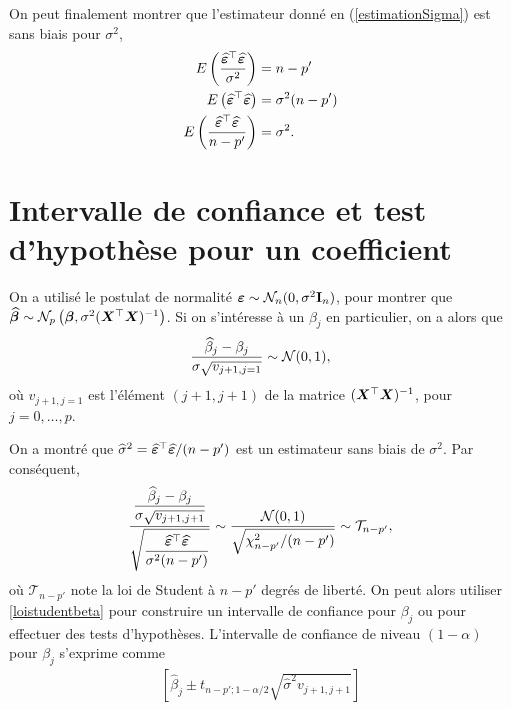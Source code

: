On peut finalement montrer que l'estimateur donné en (\ref{estimationSigma}) est sans biais pour $\sigma^2$,
\begin{align*}
E \left( \frac{\widehat{\bm\varepsilon}^\top\widehat{\bm\varepsilon}}{\sigma^2} \right) &= n-p' \\
E \left( \widehat{\bm\varepsilon}^\top\widehat{\bm\varepsilon} \right) &= \sigma^2 (n-p') \\
E \left( \frac{\widehat{\bm\varepsilon}^\top\widehat{\bm\varepsilon}}{n-p'} \right) &= \sigma^2.
\end{align*}


\section{Intervalle de confiance et test d'hypothèse pour un coefficient}
\label{sec:infbetaRLM}

On a utilisé le postulat de normalité $\bm\varepsilon \sim \mathcal{N}_n(0,\sigma^2\bold{I}_n)$, pour montrer que $\widehat{\bm\beta} \sim \mathcal{N}_p\left(\bm\beta,\sigma^2 (\bm{X}^\top\bm{X})^{-1}\right)$. Si on s'intéresse à un $\beta_j$ en particulier, on a alors que
\begin{eqnarray*}
	\frac{\widehat{\beta}_j-\beta_j}{\sigma \sqrt{v_{j+1,j=1}}} \sim \mathcal{N}(0,1),
\end{eqnarray*}
où $v_{j+1,j=1}$ est l'élément $(j+1,j+1)$ de la matrice $(\bm{X}^\top\bm{X})^{-1}$, pour $j=0, \dots, p$.

On a montré que $\widehat{\sigma}^2 = \widehat{\bm\varepsilon}^\top\widehat{\bm\varepsilon} / (n-p')$ est un estimateur sans biais de $\sigma^2$. Par conséquent,
\begin{eqnarray}
	\frac{\displaystyle\frac{\widehat{\beta}_j-\beta_j}{\sigma \sqrt{v_{j+1,j+1}}}}{\displaystyle\sqrt{\frac{\widehat{\bm\varepsilon}^\top\widehat{\bm\varepsilon}}{\sigma^2(n-p')}}} \sim \frac{\mathcal{N}(0,1)}{\sqrt{\chi^2_{n-p'}/(n-p')}} \sim \mathcal{T}_{n-p'},
	\label{loistudentbeta}
\end{eqnarray}
où $\mathcal{T}_{n-p'}$ note la loi de Student à $n-p'$ degrés de liberté. On peut alors utiliser \eqref{loistudentbeta} pour construire un intervalle de confiance pour $\beta_j$ ou pour effectuer des tests d'hypothèses.
L'intervalle de confiance de niveau $(1-\alpha)$ pour $\beta_j$ s'exprime comme
\begin{eqnarray}
\left[ \widehat\beta_j\pm t_{n-p';1-\alpha/2}\sqrt{\widehat\sigma^2 v_{j+1,j+1}} \right]
\label{intconf_beta}
\end{eqnarray}

